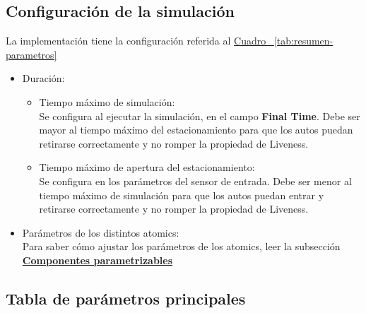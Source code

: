 \documentclass[12pt]{article}
\begin{document}
\subsection{Configuración de la simulación}
La implementación tiene la configuración referida al \hyperref[tab:resumen-parametros]{Cuadro ~\ref*{tab:resumen-parametros}}
\begin{itemize}
    \item Duración:
    \begin{itemize}
        \item Tiempo máximo de simulación: \\
        Se configura al ejecutar la simulación, en el campo \textbf{Final Time}.
        Debe ser mayor al tiempo máximo del estacionamiento para que los autos puedan retirarse correctamente y no romper la propiedad de Liveness.
        \item Tiempo máximo de apertura del estacionamiento: \\
        Se configura en los parámetros del sensor de entrada.
        Debe ser menor al tiempo máximo de simulación para que los autos puedan entrar y retirarse correctamente y no romper la propiedad de Liveness.
    \end{itemize}
    \item Parámetros de los distintos atomics: \\ Para saber cómo ajustar los parámetros de los atomics, leer la subsección \hyperref[sec:componentes_parametrizables]{\textbf{Componentes parametrizables}}
\end{itemize}

\clearpage

\subsection{Tabla de parámetros principales}
\end{document}
